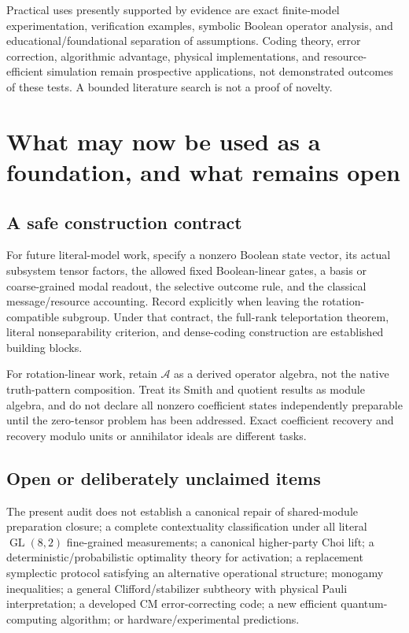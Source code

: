 \documentclass[11pt,a4paper]{article}
\theoremstyle{definition}\newtheorem{definition}[theorem]{Definition}
\newcommand{\A}{\mathcal A}
\newcommand{\GL}{\operatorname{GL}}
\begin{document}
Practical uses presently supported by evidence are exact finite-model experimentation, verification examples, symbolic Boolean operator analysis, and educational/foundational separation of assumptions. Coding theory, error correction, algorithmic advantage, physical implementations, and resource-efficient simulation remain prospective applications, not demonstrated outcomes of these tests. A bounded literature search is not a proof of novelty.

\section{What may now be used as a foundation, and what remains open}
\subsection{A safe construction contract}
For future literal-model work, specify a nonzero Boolean state vector, its actual subsystem tensor factors, the allowed fixed Boolean-linear gates, a basis or coarse-grained modal readout, the selective outcome rule, and the classical message/resource accounting. Record explicitly when leaving the rotation-compatible subgroup. Under that contract, the full-rank teleportation theorem, literal nonseparability criterion, and dense-coding construction are established building blocks.

For rotation-linear work, retain $\A$ as a derived operator algebra, not the native truth-pattern composition. Treat its Smith and quotient results as module algebra, and do not declare all nonzero coefficient states independently preparable until the zero-tensor problem has been addressed. Exact coefficient recovery and recovery modulo units or annihilator ideals are different tasks.

\subsection{Open or deliberately unclaimed items}
The present audit does not establish a canonical repair of shared-module preparation closure; a complete contextuality classification under all literal $\GL(8,2)$ fine-grained measurements; a canonical higher-party Choi lift; a deterministic/probabilistic optimality theory for activation; a replacement symplectic protocol satisfying an alternative operational structure; monogamy inequalities; a general Clifford/stabilizer subtheory with physical Pauli interpretation; a developed CM error-correcting code; a new efficient quantum-computing algorithm; or hardware/experimental predictions.
\end{document}
